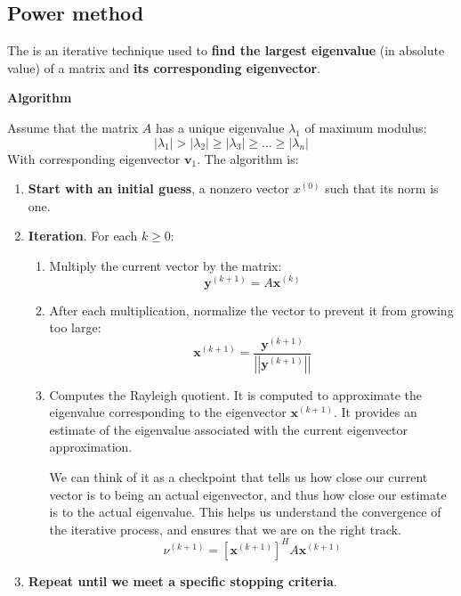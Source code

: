 \subsection{Power method}

The  is an iterative technique used to \textbf{find the largest eigenvalue} (in absolute value) of a matrix and \textbf{its corresponding eigenvector}.

\highspace
\begin{flushleft}
    \textcolor{Green3}{ \textbf{Algorithm}}
\end{flushleft}
Assume that the matrix $A$ has a unique eigenvalue $\lambda_{1}$ of maximum modulus:
\begin{equation*}
    \left|\lambda_{1}\right| > \left|\lambda_{2}\right| \ge \left|\lambda_{3}\right| \ge \dots \ge \left|\lambda_{n}\right|
\end{equation*}
With corresponding eigenvector $\mathbf{v}_{1}$. The algorithm is:
\begin{enumerate}
    \item \textbf{Start with an initial guess}, a nonzero vector $x^{\left(0\right)}$ such that its norm is one.
    \item \textbf{Iteration}. For each $k \ge 0$:
    \begin{enumerate}
        \item Multiply the current vector by the matrix:
        \begin{equation*}
            \mathbf{y}^{\left(k+1\right)} = A\mathbf{x}^{\left(k\right)}
        \end{equation*}

        \item After each multiplication, normalize the vector to prevent it from growing too large:
        \begin{equation*}
            \mathbf{x}^{\left(k+1\right)} = \dfrac{
                \mathbf{y}^{\left(k+1\right)}
            }{
                \left|\left|\mathbf{y}^{\left(k+1\right)}\right|\right|
            }
        \end{equation*}

        \item Computes the Rayleigh quotient. It is computed to approximate the eigenvalue corresponding to the eigenvector $\mathbf{x}^{\left(k+1\right)}$. It provides an estimate of the eigenvalue associated with the current eigenvector approximation.
        
        We can think of it as a checkpoint that tells us how close our current vector is to being an actual eigenvector, and thus how close our estimate is to the actual eigenvalue. This helps us understand the convergence of the iterative process, and ensures that we are on the right track.
        \begin{equation*}
            \nu^{\left(k+1\right)} = \left[\mathbf{x}^{\left(k+1\right)}\right]^{H} A\mathbf{x}^{\left(k+1\right)}
        \end{equation*}
    \end{enumerate}
    \item \textbf{Repeat until we meet a specific stopping criteria}.
\end{enumerate}

